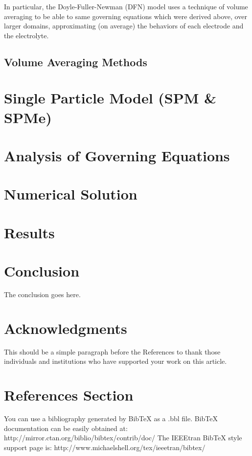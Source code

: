 \documentclass[lettersize,journal]{IEEEtran}
\begin{document}
In particular, the Doyle-Fuller-Newman (DFN) model uses a technique of volume averaging to be able to same governing equations which were derived above, over larger domains, approximating (on average) the behaviors of each electrode and the electrolyte. \\

\subsection{Volume Averaging Methods}

\section{Single Particle Model (SPM \& SPMe)}

\section{Analysis of Governing Equations}

\section{Numerical Solution}

\section{Results}

\section{Conclusion}
The conclusion goes here.


\section*{Acknowledgments}
This should be a simple paragraph before the References to thank those individuals and institutions who have supported your work on this article.

\section{References Section}
You can use a bibliography generated by BibTeX as a .bbl file.
 BibTeX documentation can be easily obtained at:
 http://mirror.ctan.org/biblio/bibtex/contrib/doc/
 The IEEEtran BibTeX style support page is:
 http://www.michaelshell.org/tex/ieeetran/bibtex/
\end{document}

